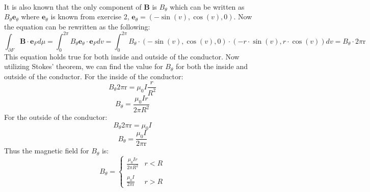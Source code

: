 \documentclass{article}
\begin{document}
\\
It is also known that the only component of $\mathbf{B}$ is $B_\theta$ which can be written as $B_\theta\mathbf{e}_\theta$ where $\mathbf{e}_\theta$ is known from exercise 2, $\mathbf{e}_{\theta}=\left(-\sin\left(v\right),\cos\left(v\right),0\right)$.
Now the equation can be rewritten as the following:
\begin{equation}
    \int_{\partial F}^{}\mathbf{B}\cdot \mathbf{e}_{F}d\mu=\int_{0}^{2\pi}B_{\theta}\mathbf{e}_{\theta}\cdot \mathbf{e}_{F}dv=\int_{0}^{2\pi}B_{\theta}\cdot \left(-\sin\left(v\right),\cos\left(v\right),0\right)\cdot \left(-r\cdot \sin\left(v\right),r\cdot \cos\left(v\right)\right)dv=B_{\theta}\cdot 2\pi\mathrm{r}
\end{equation}
This equation holds true for both inside and outside of the conductor.
Now utilizing Stokes' theorem, we can find the value for $B_\theta$ for both the inside and outside of the conductor.
For the inside of the conductor:
\begin{equation}
    B_{\theta} 2\pi\mathrm{r}=\mu_{0}I\frac{r}{R^{2}}
\end{equation}
\begin{equation}
    B_{\theta}=\frac{\mu_{0}\mathit{Ir}}{2\pi R^{2}}
\end{equation}
For the outside of the conductor:
\begin{equation}
    B_{\theta} 2\pi \mathrm{r}=\mu_{0}I
\end{equation}
\begin{equation}
    B_{\theta}=\frac{\mu_{0}I}{2\pi \mathrm{r}}
\end{equation}
Thus the magnetic field for $B_\theta$ is:
\begin{equation}
    B_{\theta}=\left\{\begin{array}{cc}
\frac{\mu_{0}\mathit{Ir}}{2\pi R^{2}} & r<R 
\\
\\
 \frac{\mu_{0}I}{2\pi \mathrm{r}} & r>R 
\end{array}\right.
\end{equation}
\end{document}
